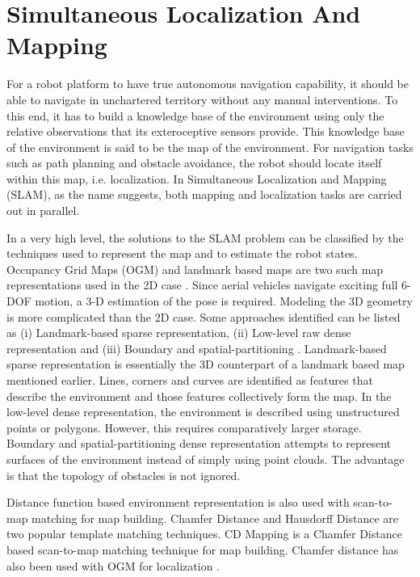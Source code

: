 \documentclass[12pt,a4paper]{report}
\begin{document}
\section{Simultaneous Localization And Mapping}
For a robot platform to have true autonomous navigation capability, it should be able to navigate in unchartered territory without any manual interventions. To this end, it has to build a knowledge base of the environment using only the relative observations that its exteroceptive sensors provide. This knowledge base of the environment is said to be the map of the environment. For navigation tasks such as path planning and obstacle avoidance, the robot should locate itself within this map, i.e. localization. In Simultaneous Localization and Mapping (SLAM), as the name suggests, both mapping and localization tasks are carried out in parallel. \par

In a very high level, the solutions to the SLAM problem can be classified by the techniques used to represent the map and to estimate the robot states. Occupancy Grid Maps (OGM) and landmark based maps are two such map representations used in the 2D case \cite{WURM2010140}. Since aerial vehicles navigate exciting full 6-DOF motion, a 3-D estimation of the pose is required. Modeling the 3D geometry is more complicated than the 2D case. Some approaches identified can be listed as (i) Landmark-based sparse representation, (ii) Low-level raw dense representation and (iii) Boundary and spatial-partitioning \cite{Cadena2016}. Landmark-based sparse representation is essentially the 3D counterpart of a landmark based map mentioned earlier. Lines, corners and curves are identified as features that describe the environment and those features collectively form the map. In the low-level dense representation, the environment is described using unstructured points or polygons. However, this requires comparatively larger storage. Boundary and spatial-partitioning dense representation attempts to represent surfaces of the environment instead of simply using point clouds. The advantage is that the topology of obstacles is not ignored.

Distance function based environment representation is also used with scan-to-map matching for map building. Chamfer Distance \cite{barrow1977parametric} and Hausdorff Distance \cite{huttenlocher1993comparing} are two popular template matching techniques. CD Mapping \cite{dantanarayana2016navigation} is a Chamfer Distance based scan-to-map matching technique for map building. Chamfer distance has also been used with OGM for localization \cite{dantanarayana2013c}.
\end{document}
